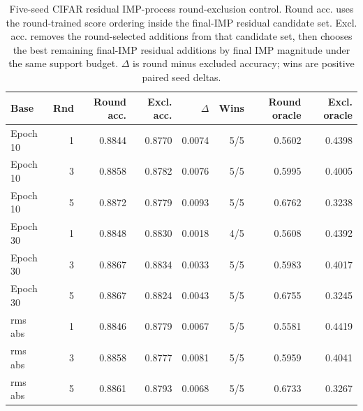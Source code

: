 \begin{table}[t]
\centering
\scriptsize
\setlength{\tabcolsep}{3pt}
\begin{tabular}{lrrrrrrr}
\toprule
Base & Rnd & Round acc. & Excl. acc. & $\Delta$ & Wins & Round oracle & Excl. oracle \\
\midrule
Epoch 10 & 1 & 0.8844 & 0.8770 & 0.0074 & 5/5 & 0.5602 & 0.4398 \\
Epoch 10 & 3 & 0.8858 & 0.8782 & 0.0076 & 5/5 & 0.5995 & 0.4005 \\
Epoch 10 & 5 & 0.8872 & 0.8779 & 0.0093 & 5/5 & 0.6762 & 0.3238 \\
Epoch 30 & 1 & 0.8848 & 0.8830 & 0.0018 & 4/5 & 0.5608 & 0.4392 \\
Epoch 30 & 3 & 0.8867 & 0.8834 & 0.0033 & 5/5 & 0.5983 & 0.4017 \\
Epoch 30 & 5 & 0.8867 & 0.8824 & 0.0043 & 5/5 & 0.6755 & 0.3245 \\
rms abs & 1 & 0.8846 & 0.8779 & 0.0067 & 5/5 & 0.5581 & 0.4419 \\
rms abs & 3 & 0.8858 & 0.8777 & 0.0081 & 5/5 & 0.5959 & 0.4041 \\
rms abs & 5 & 0.8861 & 0.8793 & 0.0068 & 5/5 & 0.6733 & 0.3267 \\
\bottomrule
\end{tabular}
\caption{Five-seed CIFAR residual IMP-process round-exclusion control. Round acc. uses the round-trained score ordering inside the final-IMP residual candidate set. Excl. acc. removes the round-selected additions from that candidate set, then chooses the best remaining final-IMP residual additions by final IMP magnitude under the same support budget. $\Delta$ is round minus excluded accuracy; wins are positive paired seed deltas.}
\label{tab:cifar-residual-imp-process-round-exclusion}
\end{table}

\begin{table}[t]
\centering
\scriptsize
\setlength{\tabcolsep}{2pt}
\caption{Five-seed CIFAR residual IMP-process tensor-matched round-exclusion control at the RMS trajectory base and round 5. Tensor excl. removes the round-selected additions, then chooses replacement final-IMP residual additions matched to the removed coordinates by parameter tensor before applying the final IMP magnitude score. $\Delta_E$ is round minus the unrestricted excluded oracle; $\Delta_T$ is round minus the tensor-matched excluded oracle.}
\label{tab:cifar-residual-imp-process-layer-exclusion}
\end{table}

